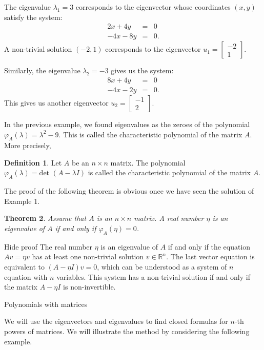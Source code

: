 \documentclass[11pt]{article}
\newtheorem{thm}{Theorem}[section]
\theoremstyle{definition}
\newtheorem{defn}[thm]{Definition}
\theoremstyle{plain}
\begin{document}
The eigenvalue \( \lambda_1=3 \) corresponds to the eigenvector whose coordinates \( (x,y) \) satisfy the system: \begin{eqnarray*} 2x+4y&=&0\\ -4x-8y&=&0. \end{eqnarray*} A non-trivial solution \( (-2,1) \) corresponds to the eigenvector \( u_1=\left[\begin{array}{c}-2\\1\end{array}\right]\).

Similarly, the eigenvalue \( \lambda_2=-3 \) gives us the system: \begin{eqnarray*} 8x+4y&=&0\\ -4x-2y&=&0. \end{eqnarray*} This gives us another eigenvector \( u_2=\left[\begin{array}{c}-1\\2\end{array}\right]\).

In the previous example, we found eigenvalues as the zeroes of the polynomial \( \varphi_A(\lambda)=\lambda^2-9 \). This is called the characteristic polynomial of the matrix \( A \). More precisely,

\begin{defn}
Let \( A \) be an \( n\times n \) matrix. The polynomial \( \varphi_A(\lambda)=\mbox{det }\left(A-\lambda I\right)\) is called the characteristic polynomial of the matrix \( A \).
\end{defn}

The proof of the following theorem is obvious once we have seen the solution of Example 1.

\begin{thm}
Assume that \( A \) is an \( n\times n \) matrix. A real number \( \eta \) is an eigenvalue of \( A \) if and only if \( \varphi_A(\eta)=0 \).
\end{thm}
Hide proof
The real number \( \eta \) is an eigenvalue of \( A \) if and only if the equation \( Av=\eta v \) has at least one non-trivial solution \( v\in\mathbb R^n \). The last vector equation is equivalent to \( (A-\eta I)v=0 \), which can be understood as a system of \( n \) equation with \( n \) variables. This system has a non-trivial solution if and only if the matrix \( A-\eta I \) is non-invertible.

Polynomials with matrices

We will use the eigenvectors and eigenvalues to find closed formulas for \( n \)-th powers of matrices. We will illustrate the method by considering the following example.
\end{document}
